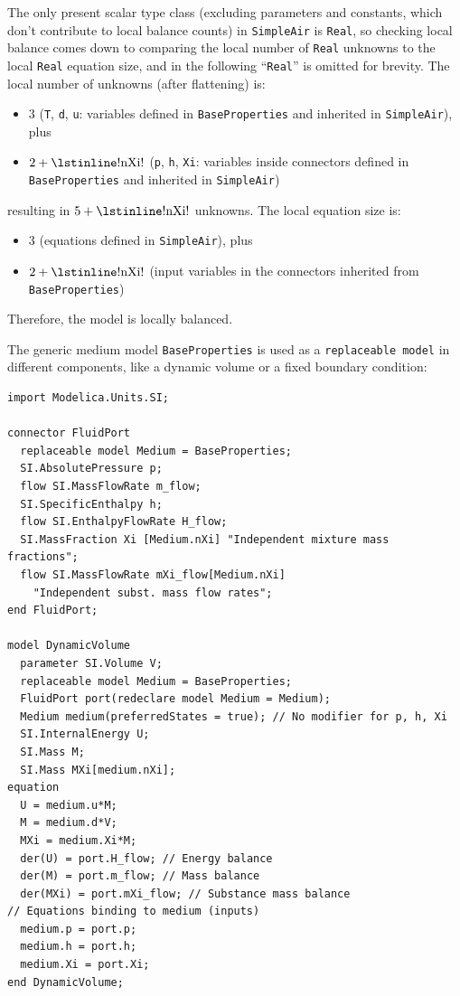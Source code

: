 \begin{example}
The only present scalar type class (excluding parameters and constants, which don't contribute to local balance counts) in \lstinline!SimpleAir! is \lstinline!Real!, so checking local balance comes down to comparing the local number of \lstinline!Real! unknowns to the local \lstinline!Real! equation size, and in the following ``\lstinline!Real!'' is omitted for brevity.
The local number of unknowns (after flattening) is:
\begin{itemize}
\item
  $3$ (\lstinline!T!, \lstinline!d!, \lstinline!u!: variables defined in
  \lstinline!BaseProperties! and inherited in \lstinline!SimpleAir!), plus
\item
  $2 + \text{\lstinline!nXi!}$ (\lstinline!p!, \lstinline!h!, \lstinline!Xi!: variables inside connectors defined in \lstinline!BaseProperties! and inherited in \lstinline!SimpleAir!)
\end{itemize}
resulting in $5 + \text{\lstinline!nXi!}$ unknowns.
The local equation size is:
\begin{itemize}
\item
  $3$ (equations defined in \lstinline!SimpleAir!), plus
\item
  $2 + \text{\lstinline!nXi!}$ (input variables in the connectors inherited from \lstinline!BaseProperties!)
\end{itemize}

Therefore, the model is locally balanced.

The generic medium model \lstinline!BaseProperties! is used as a \lstinline!replaceable model! in different components, like a dynamic volume or a fixed boundary condition:
\begin{lstlisting}[language=modelica]
import Modelica.Units.SI;

connector FluidPort
  replaceable model Medium = BaseProperties;
  SI.AbsolutePressure p;
  flow SI.MassFlowRate m_flow;
  SI.SpecificEnthalpy h;
  flow SI.EnthalpyFlowRate H_flow;
  SI.MassFraction Xi [Medium.nXi] "Independent mixture mass fractions";
  flow SI.MassFlowRate mXi_flow[Medium.nXi]
    "Independent subst. mass flow rates";
end FluidPort;

model DynamicVolume
  parameter SI.Volume V;
  replaceable model Medium = BaseProperties;
  FluidPort port(redeclare model Medium = Medium);
  Medium medium(preferredStates = true); // No modifier for p, h, Xi
  SI.InternalEnergy U;
  SI.Mass M;
  SI.Mass MXi[medium.nXi];
equation
  U = medium.u*M;
  M = medium.d*V;
  MXi = medium.Xi*M;
  der(U) = port.H_flow; // Energy balance
  der(M) = port.m_flow; // Mass balance
  der(MXi) = port.mXi_flow; // Substance mass balance
// Equations binding to medium (inputs)
  medium.p = port.p;
  medium.h = port.h;
  medium.Xi = port.Xi;
end DynamicVolume;
\end{lstlisting}


\end{example}

